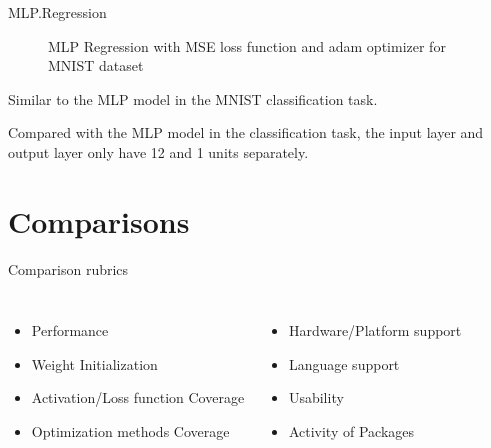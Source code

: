 \documentclass[10pt]{beamer}
\begin{document}
\begin{frame}{MLP.Regression}
\begin{figure}[ht!]
{}
    \caption{MLP Regression with MSE loss function and adam optimizer for MNIST dataset}
    \label{ch.f4}
    \end{figure} 
    Similar to the MLP model in the MNIST classification task.\par
    Compared with the MLP model in the classification task, the input layer and output layer only have 12 and 1 units separately.
\end{frame}

\section[Comparisons]{Comparisons}

\begin{frame}{Comparison rubrics}
\begin{columns}[T,onlytextwidth]
    \begin{itemize}
        \item Performance
        \item Weight Initialization
        \item Activation/Loss function Coverage
        \item Optimization methods Coverage
    \end{itemize}
    \begin{itemize}
        \item Hardware/Platform support
        \item Language support
        \item Usability
        \item Activity of Packages
    \end{itemize}
\end{columns}

\end{frame}
\end{document}
